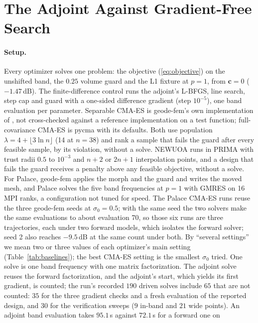 \documentclass{anvil-paper}
\begin{document}
\section{The Adjoint Against Gradient-Free Search}
\label{sec:baselines}

\paragraph{Setup.}
Every optimizer solves one problem: the objective (\ref{eq:objective}) on
the unshifted band, the $0.25$ volume guard and the L1 fixture at $p = 1$,
from $\mathbf{c} = 0$ ($-1.47$\,dB). The finite-difference control runs the
adjoint's L-BFGS, line search, step cap and guard with a one-sided
difference gradient (step $10^{-5}$), one band evaluation per parameter.
Separable CMA-ES is geode-fem's own implementation of
\citet{ros2008separable}, not cross-checked against a reference
implementation on a test function; full-covariance CMA-ES is pycma
\citep{pycma} with its defaults. Both use population
$\lambda = 4 + \lfloor 3\ln n\rfloor$ (14 at $n = 38$) and rank a sample
that fails the guard after every feasible sample, by its violation, without
a solve. NEWUOA runs in PRIMA with trust radii $0.5$ to $10^{-3}$ and $n + 2$
or $2n + 1$ interpolation points, and a design that fails the guard receives
a penalty above any feasible objective, without a solve. For Palace,
geode-fem applies the morph and the guard and writes the moved mesh, and
Palace solves the five band frequencies at $p = 1$ with GMRES on 16 MPI
ranks, a configuration not tuned for speed. The Palace CMA-ES runs reuse the
three geode-fem seeds at $\sigma_0 = 0.5$; with the same seed the two solvers
make the same evaluations to about evaluation 70, so those six runs are
three trajectories, each under two forward models, which isolates the
forward solver; seed 2 also reaches $-9.5$\,dB at the same count under both.
By ``several settings'' we mean two or three values of each optimizer's
main setting (Table~\ref{tab:baselines}); the best CMA-ES setting is the
smallest $\sigma_0$ tried. One solve is one band frequency with one matrix factorization. The adjoint
solve reuses the forward factorization, and the adjoint's start, which
yields its first gradient, is counted; the run's recorded $190$ driven
solves include $65$ that are not counted: $35$ for the three gradient checks
and a fresh evaluation of the reported design, and $30$ for the verification
sweeps ($9$ in-band and $21$ wide points). An
adjoint band evaluation takes $95.1$\,s against $72.1$\,s for a forward one on
\end{document}
